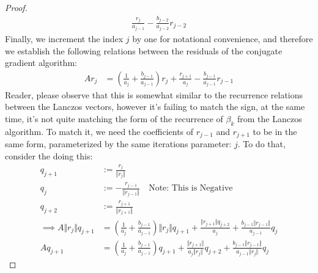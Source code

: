 \documentclass[]{article}
\theoremstyle{definition}
\begin{document}
\begin{proof}
\begin{align}
                    \frac{r_{j}}{a_{j-1}} - 
                    \frac{b_{j - 2}}{a_{j - 2}}r_{j - 2}
                \end{align}
                Finally, we increment the index $j$ by one for notational convenience, and therefore we establish the following relations between the residuals of the conjugate gradient algorithm: 
                \begin{align}
                    Ar_{j} &=
                    \left(
                        \frac{1}{a_{j}} + \frac{b_{j - 1}}{a_{j-  1}}
                    \right)r_{j} + 
                    \frac{r_{j + 1}}{a_{j}} - 
                    \frac{b_{j - 1}}{a_{j - 1}}r_{j - 1}
                \end{align}
                Reader, please observe that this is somewhat similar to the recurrence relations between the Lanczos vectors, however it's failing to match the sign, at the same time, it's not quite matching the form of the recurrence of $\beta_k$ from the Lanczos algorithm. To match it, we need the coefficients of $r_{j - 1}$ and $r_{j + 1}$ to be in the same form, parameterized by the same iterations parameter: $j$. To do that, consider the doing this:  
                \begin{align}
                    q_{j + 1} &:= \frac{r_{j}}{\Vert r_j\Vert}
                    \\
                    q_{j} &:= -\frac{r_{j - 1}}{\Vert r_{j - 1}\Vert} \quad 
                    \text{Note: This is Negative}
                    \\
                    q_{j + 2} &:= \frac{r_{j + 1}}{\Vert r_{j + 1}\Vert}
                    \\
                    \implies 
                    A\Vert r_j\Vert q_{j + 1} 
                    &= 
                    \left(
                        \frac{1}{a_j} + \frac{b_{j - 1}}{a_{j - 1}}
                    \right)\Vert r_j\Vert q_{j + 1}
                    + 
                    \frac{\Vert r_{j + 1}\Vert q_{j + 2}}{a_j}
                    +
                    \frac{b_{j - 1}\Vert r_{j - 1}\Vert}{a_{j - 1}}q_{j}
                    \\
                    Aq_{j + 1} &= 
                    \left(
                        \frac{1}{a_j} + \frac{b_{j - 1}}{a_{j - 1}} 
                    \right)
                    q_{j + 1}
                    + 
                    \frac{\Vert r_{j + 1}\Vert}{a_j \Vert r_j\Vert}q_{j + 2} + 
                    \frac{b_{j - 1}\Vert r_{j - 1}\Vert}{a_{j - 1}\Vert r_j\Vert}q_j

\end{align}
\end{proof}
\end{document}

